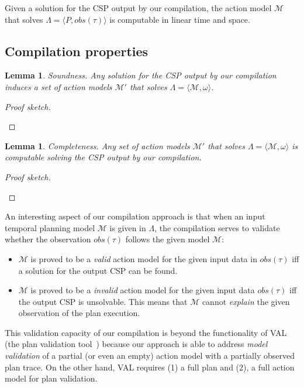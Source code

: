 \documentclass[letterpaper]{article} %
\newcommand{\tup}[1]{{\langle #1 \rangle}}
\newtheorem{lemma}[theorem]{Lemma}
\begin{document}
Given a solution for the CSP output by our compilation, the action model $\mathcal{M}$ that solves $\Lambda=\tup{P,obs(\tau)}$ is computable in linear time and space. 


\subsection{Compilation properties}
\begin{lemma}
Soundness. Any solution for the CSP output by our compilation induces a set of action models $\mathcal{M}'$ that solves $\Lambda=\tup{\mathcal{M},\omega}$.
\end{lemma}

\begin{proof}[Proof sketch]
\begin{small}
\end{small}
\end{proof}

\begin{lemma}
Completeness. Any set of action models $\mathcal{M}'$ that solves $\Lambda=\tup{\mathcal{M},\omega}$ is computable solving the CSP output by our compilation.
\end{lemma}

\begin{proof}[Proof sketch]
\begin{small}
\end{small}
\end{proof}

An interesting aspect of our compilation approach is that when an input temporal planning model $\mathcal{M}$ is given in $\Lambda$, the compilation serves to validate whether the observation $obs(\tau)$ follows the given model $\mathcal{M}$:

\begin{itemize}
	\item $\mathcal{M}$ is proved to be a {\em valid} action model for the given input data in $obs(\tau)$ iff a solution for the output CSP can be found.
	\item $\mathcal{M}$ is proved to be a {\em invalid} action model for the given input data $obs(\tau)$ iff the output CSP is unsolvable. This means that $\mathcal{M}$ cannot {\em explain} the given observation of the plan execution.
\end{itemize}

This validation capacity of our compilation is beyond the functionality of VAL (the plan validation tool~\cite{howey2004val}) because our approach is able to address {\em model validation} of a partial (or even an empty) action model with a partially observed plan trace. On the other hand, VAL requires (1) a full plan and (2), a full action model for plan validation.
\end{document}
